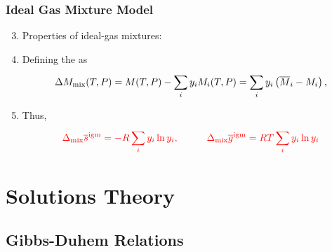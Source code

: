 \documentclass[10pt,compress,handout,ignorenonframetext,unknownkeysallowed]{beamer}
\begin{document}
\begin{frame}
  \frametitle{Ideal Gas Mixture Model}
  \begin{enumerate}\setcounter{enumi}{2}
      \item<1->Properties of ideal-gas mixtures:
      \item<2-> Defining the   as
           \begin{displaymath}
              \Delta M_{\text{mix}}(T,P) =  M(T,P) - \summation[y_{i}M_{i}(T,P)]{i}{} = \summation[y_{i}\left(\overline{M}_{i}-M_{i}\right)]{i}{},
           \end{displaymath}
      \item<3-> Thus,
           \begin{displaymath}
              \red{\Delta_{\text{mix}} \overline{s}^{\text{igm}} = -R\summation[y_{i}\ln{y_{i}}]{i}{}, \hspace{1cm} \Delta_{\text{mix}} \overline{g}^{\text{igm}} = RT\summation[y_{i}\ln{y_{i}}]{i}{}}
           \end{displaymath}


  \end{enumerate}
  \begin{center}
  \end{center}
\end{frame}
\normalsize


\section{Solutions Theory}

\subsection{Gibbs-Duhem Relations}
\end{document}
